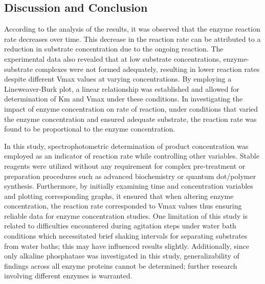 \documentclass[a4paper,10pt]{article}
\begin{document}
\begin{multicols}{2}
\section{Discussion and Conclusion}
According to the analysis of the results, it was observed that the enzyme reaction rate decreases over time. This decrease in the reaction rate can be attributed to a reduction in substrate concentration due to the ongoing reaction. The experimental data also revealed that at low substrate concentrations, enzyme-substrate complexes were not formed adequately, resulting in lower reaction rates despite different Vmax values at varying concentrations. By employing a Lineweaver-Burk plot, a linear relationship was established and allowed for determination of Km and Vmax under these conditions. In investigating the impact of enzyme concentration on rate of reaction, under conditions that varied the enzyme concentration and ensured adequate substrate, the reaction rate was found to be proportional to the enzyme concentration.

In this study, spectrophotometric determination of product concentration was employed as an indicator of reaction rate while controlling other variables. Stable reagents were utilized without any requirement for complex pre-treatment or preparation procedures such as advanced biochemistry or quantum dot/polymer synthesis. Furthermore, by initially examining time and concentration variables and plotting corresponding graphs, it ensured that when altering enzyme concentration, the reaction rate corresponded to Vmax values thus ensuring reliable data for enzyme concentration studies. One limitation of this study is related to difficulties encountered during agitation steps under water bath conditions which necessitated brief shaking intervals for separating substrates from water baths; this may have influenced results slightly. Additionally, since only alkaline phosphatase was investigated in this study, generalizability of findings across all enzyme proteins cannot be determined; further research involving different enzymes is warranted.


\end{multicols}
\end{document}
